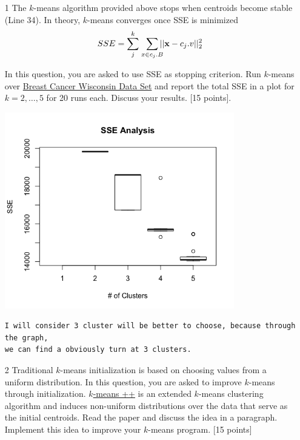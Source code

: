 \documentclass{article}
\begin{document}
\begin{enumerate}

\item[1] The $k$-means algorithm provided above stops when centroids become stable (Line  34). In theory, $k$-means converges once SSE is minimized
\begin{eqnarray*}
SSE = \sum_{j}^k \ \ \smashoperator{ \sum_{x \in c_j.B}} ||\mathbf{x} - c_j.v||^2_2 \label{costfunt}
\end{eqnarray*} 
 
In this question, you are asked to use SSE as stopping criterion. Run $k$-means over  \href{https://archive.ics.uci.edu/ml/datasets/breast+cancer+wisconsin+(original)}{ Breast Cancer Wisconsin Data Set} and report the total SSE  in a plot for $k = 2,\ldots ,5$ for 20 runs each. Discuss your results. [15 points].

\includegraphics[width=10cm]{E1.png}
\begin{verbatim}
I will consider 3 cluster will be better to choose, because through the graph, 
we can find a obviously turn at 3 clusters.
\end{verbatim}

\item[2] Traditional $k$-means initialization is based on choosing values from a uniform distribution. In this question, you are asked to improve $k$-means through initialization.  \href{http://ilpubs.stanford.edu:8090/778/1/2006-13.pdf}{$k$-means ++} is an extended $k$-means clustering algorithm and induces non-uniform  distributions over  the data  that serve as  the initial centroids. Read the paper and discuss the idea in a paragraph.  Implement this idea to improve your $k$-means program. [15 points]
\end{enumerate}
\end{document}
